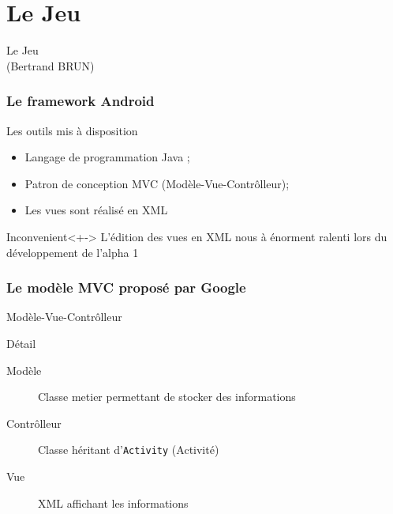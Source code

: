 \documentclass{beamer}
\def\android{Android\texttrademark}
\begin{document}
\section{Le Jeu}

\begin{frame}
  \begin{center}
    Le Jeu\\(Bertrand BRUN)
  \end{center}
\end{frame}

\begin{frame}
\frametitle{Le framework \android{}}
\begin{block}{Les outils mis à disposition}
  \begin{itemize}
    \item<+-> Langage de programmation Java ;
    \item<+-> Patron de conception MVC (Modèle-Vue-Contrôlleur);
    \item<+-> Les vues sont réalisé en XML
  \end{itemize}
\end{block}
\begin{alertblock}{Inconvenient}<+->
  L'édition des vues en XML nous à énorment ralenti lors du développement de l'alpha 1
\end{alertblock}
\end{frame}

\begin{frame}
\frametitle{Le modèle MVC proposé par Google}
\begin{block}{Modèle-Vue-Contrôlleur}
  \centering
\end{block}
\begin{block}{Détail}
\begin{description}
  \item[Modèle] Classe metier permettant de stocker des informations
  \item[Contrôlleur] Classe héritant d'\verb!Activity! (Activité)
  \item[Vue] XML affichant les informations
\end{description}
\end{block}
\end{frame}
\end{document}
